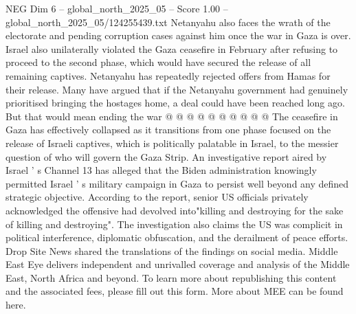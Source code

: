 \begin{textsample}{NEG Dim 6 – global\_north\_2025\_05 – Score 1.00 – global\_north\_2025\_05/124255439.txt}
Netanyahu also faces the wrath of the electorate and pending corruption cases against him once the war in Gaza is over.
Israel also unilaterally violated the Gaza ceasefire in February after refusing to proceed to the second phase, which would have secured the release of all remaining captives.
Netanyahu has repeatedly rejected offers from Hamas for their release.
Many have argued that if the Netanyahu government had genuinely prioritised bringing the hostages home, a deal could have been reached long ago.
But that would mean ending the war @ @ @ @ @ @ @ @ @ @ The ceasefire in Gaza has effectively collapsed as it transitions from one phase focused on the release of Israeli captives, which is politically palatable in Israel, to the messier question of who will govern the Gaza Strip.
An investigative report aired by Israel ' s Channel 13 has alleged that the Biden administration knowingly permitted Israel ' s military campaign in Gaza to persist well beyond any defined strategic objective.
According to the report, senior US officials privately acknowledged the offensive had devolved into"killing and destroying for the sake of killing and destroying".
The investigation also claims the US was complicit in political interference, diplomatic obfuscation, and the derailment of peace efforts.
Drop Site News shared the translations of the findings on social media.
Middle East Eye delivers independent and unrivalled coverage and analysis of the Middle East, North Africa and beyond.
To learn more about republishing this content and the associated fees, please fill out this form.
More about MEE can be found here.

\end{textsample}
